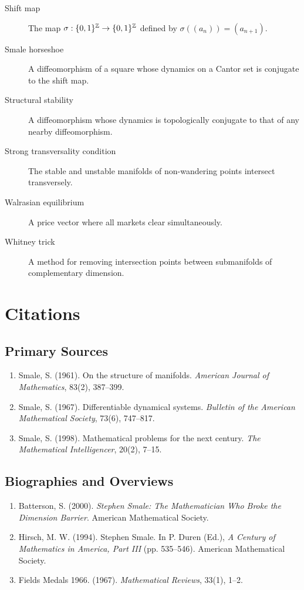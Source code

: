 \begin{description}
    \item[Shift map] The map \(\sigma: \{0,1\}^{\mathbb{Z}} \to \{0,1\}^{\mathbb{Z}}\) defined by \(\sigma((a_n)) = (a_{n+1})\).
    \item[Smale horseshoe] A diffeomorphism of a square whose dynamics on a Cantor set is conjugate to the shift map.
    \item[Structural stability] A diffeomorphism whose dynamics is topologically conjugate to that of any nearby diffeomorphism.
    \item[Strong transversality condition] The stable and unstable manifolds of non-wandering points intersect transversely.
    \item[Walrasian equilibrium] A price vector where all markets clear simultaneously.
    \item[Whitney trick] A method for removing intersection points between submanifolds of complementary dimension.
\end{description}

\section{Citations}

\subsection*{Primary Sources}
\begin{enumerate}
    \item Smale, S. (1961). On the structure of manifolds. \textit{American Journal of Mathematics}, 83(2), 387--399.
    \item Smale, S. (1967). Differentiable dynamical systems. \textit{Bulletin of the American Mathematical Society}, 73(6), 747--817.
    \item Smale, S. (1998). Mathematical problems for the next century. \textit{The Mathematical Intelligencer}, 20(2), 7--15.
\end{enumerate}

\subsection*{Biographies and Overviews}
\begin{enumerate}
    \item Batterson, S. (2000). \textit{Stephen Smale: The Mathematician Who Broke the Dimension Barrier}. American Mathematical Society.
    \item Hirsch, M. W. (1994). Stephen Smale. In P. Duren (Ed.), \textit{A Century of Mathematics in America, Part III} (pp. 535--546). American Mathematical Society.
    \item Fields Medals 1966. (1967). \textit{Mathematical Reviews}, 33(1), 1--2.
\end{enumerate}

